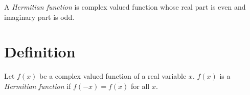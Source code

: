 \documentclass[12pt]{article}
\begin{document}
A \emph{Hermitian function} is complex valued function whose real part is even and imaginary part is odd.

\section{Definition}

Let $f(x)$ be a complex valued function of a real variable $x$. $f(x)$ is a \emph{Hermitian function} if $f(-x)=\overline{f(x)}$ for all $x$.
\end{document}
